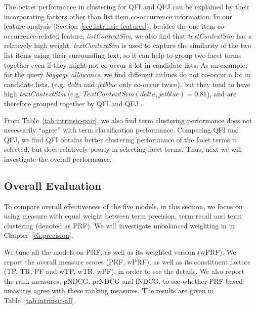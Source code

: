 The better performance in clustering for QFI and QFJ can be explained by their incorporating factors other than list item co-occurrence information. In our feature analysis (Section~\ref{sec:intrinsic-features}), besides the one item co-occurrence related feature, \textit{listContextSim}, we also find that \textit{textContextSim} has a relatively high weight. \textit{textContextSim} is used to capture the similarity of the two list items using their surrounding text, so it can help to group two facet terms together even if they might not co-occur a lot in candidate lists. As an example, for the query \textit{baggage allowance}, we find different airlines do not co-occur a lot in candidate lists, (e.g. \textit{delta} and \textit{jetblue} only co-occur twice), but they tend to have high \textit{textContextSim} (e.g. $TextContextSim(delta,jetblue)=0.81$), and are therefore grouped together by QFI and QFJ .

From Table~\ref{tab:intrinsic-pair}, we also find term clustering performance does not necessarily ``agree'' with term classification performance. Comparing QFI and QFJ, we find QFI obtains better clustering performance of the facet terms it selected, but does relatively poorly in selecting facet terms. Thus, next we will investigate the overall performance.


\subsection{Overall Evaluation}
To compare overall effectiveness of the five models, in this section, we focus on using \PRF measure with equal weight between term precision, term recall and term clustering (denoted as PRF). We will investigate unbalanced weighting in \PRF in Chapter~\ref{ch:precision}.


We tune all the models on PRF, as well as its weighted version (wPRF). We report the overall measure scores (PRF, wPRF), as well as its constituent factors (TP, TR, PF and wTP, wTR, wPF), in order to see the details. We also report the rank measures, pNDCG, prNDCG and fNDCG, to see whether PRF based measures agree with these ranking measures. The results are given in Table~\ref{tab:intrinsic-all}.

